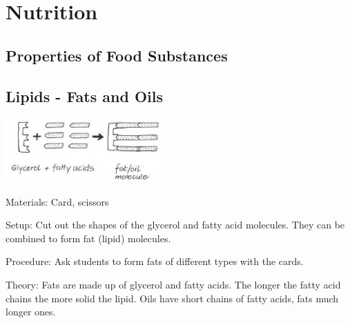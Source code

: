 \section{Nutrition} 

\begin{multicols}{2}




\section*{Properties of Food Substances}


\subsection{Lipids - Fats and Oils}  %

\begin{center}
\includegraphics[width=0.45\textwidth]{./img/vso/lipids.jpg}
\end{center}

\begin{description*}
\item[Materials:]{Card, scissors}
\item[Setup:]{Cut out the shapes of the glycerol and fatty acid molecules. They can be
combined to form fat (lipid) molecules.}
\item[Procedure:]{Ask students to form fats of different types with the cards. }
\item[Theory:]{Fats are made up of glycerol and fatty acids. The longer the fatty acid chains
the more solid the lipid. Oils have short chains of fatty acids, fats much
longer ones.}
\end{description*}


\end{multicols}
